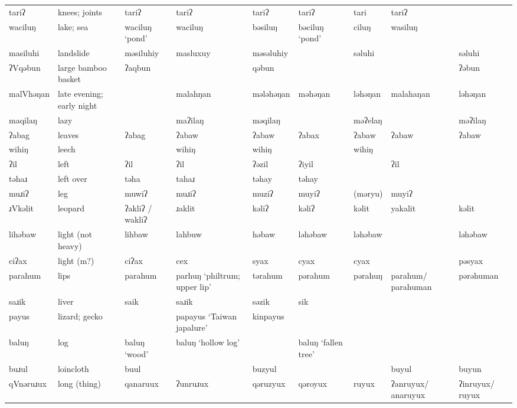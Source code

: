 \begin{landscape}
\begin{longtable}{*{9}{>{\raggedright\arraybackslash}p{}}}
\text{*}tariʔ        & knees; joints & tariʔ & tariʔ & tariʔ & tariʔ & tari & tariʔ & \\
\text{*}waciluŋ      & lake; sea & waciluŋ `pond' & waciluŋ & bəsiluŋ & bəciluŋ `pond' & ciluŋ & wasiluŋ & \\
\text{*}masiluhi     & landslide & məsiluhiy & masluxuy & məsəluhiy &  & səluhi &  & səluhi\\
\text{*}ʔVqəbun      & large bamboo basket & ʔaqbun &  & qəbun &  &  &  & ʔəbun\\
\text{*}malVhəŋan    & late evening; early night &  & malahŋan & mələhəŋan & məhəŋan & ləhəŋan & malahaŋan & ləhəŋan\\
\text{*}maqilaŋ      & lazy &  & maʔilaŋ & məqilaŋ &  & məʔelaŋ &  & məʔilaŋ\\
\text{*}ʔabag        & leaves & ʔabag & ʔabaw & ʔabaw & ʔabax & ʔabaw & ʔabaw & ʔabaw\\
\text{*}wihiŋ        & leech &  & wihiŋ & wihiŋ &  & wihiŋ &  & \\
\text{*}ʔil          & left & ʔil & ʔil & ʔəzil & ʔiyil &  & ʔil & \\
\text{*}təhaɹ        & left over & təha & tahaɹ & təhay & təhay &  &  & \\
\text{*}muɹiʔ        & leg & muwiʔ & muɹiʔ & muziʔ & muyiʔ & (məryu) & muyiʔ & \\
\text{*}ɹVkəlit      & leopard & ʔakliʔ / wakliʔ & ɹaklit & kəliʔ & kəliʔ & kəlit & yakalit & kəlit\\
\text{*}lihəbaw      & light (not heavy) & lihbaw & lahbuw & həbaw & ləhəbaw & ləhəbaw &  & ləhəbaw\\
\text{*}ciʔax        & light (m?) & ciʔax & cex & syax & cyax & cyax &  & pəsyax\\
\text{*}parahum      & lips & parahum & parhuŋ `philtrum; upper lip' & tərahum & pərahum & pərahuŋ & parahum/ parahuman & pərəhuman\\
\text{*}saɹik        & liver & saik & saɹik & səzik & sik &  &  & \\
\text{*}payus       & lizard; gecko &  & papayus `Taiwan japalure' & kinpayus &  &  &  & \\
\text{*}baluŋ        & log & baluŋ `wood' & baluŋ \newline `hollow log' &  & baluŋ \newline `fallen tree' &  &  & \\
\text{*}buɹul        & loincloth & buul &  & buzyul &  &  & buyul & buyun\\
\text{*}qVnəruɹux    & long (thing) & qanaruux & ʔunruɹux & qəruzyux & qəroyux & ruyux & ʔanruyux/ \newline anaruyux & ʔinruyux/ \newline ruyux\\

\end{longtable}
\end{landscape}
